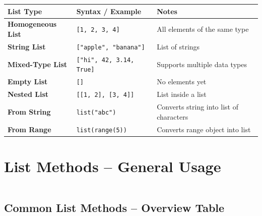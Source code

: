 \documentclass[a4paper,11pt]{article}
\begin{document}
	\begin{tabular}{>{\bfseries}p{4.2cm} p{7cm} p{2.8cm}}
		\toprule
		List Type & Syntax / Example & Notes \\
		\midrule
		
		Homogeneous List & \texttt{[1, 2, 3, 4]} & All elements of the same type \\
		
		String List & \texttt{["apple", "banana"]} & List of strings \\
		
		Mixed-Type List & \texttt{["hi", 42, 3.14, True]} & Supports multiple data types \\
		
		Empty List & \texttt{[]} & No elements yet \\
		
		Nested List & \texttt{[[1, 2], [3, 4]]} & List inside a list \\
		
		From String & \texttt{list("abc")} & Converts string into list of characters \\
		
		From Range & \texttt{list(range(5))} & Converts range object into list \\
		
		\bottomrule
	\end{tabular}
	
		\newpage
	
	\section{List Methods – General Usage}
	\inputminted{python}{Python_Files/list_methods_general.py}
	
	\vspace{1em}
	\subsection*{Common List Methods – Overview Table}
	
\end{document}
